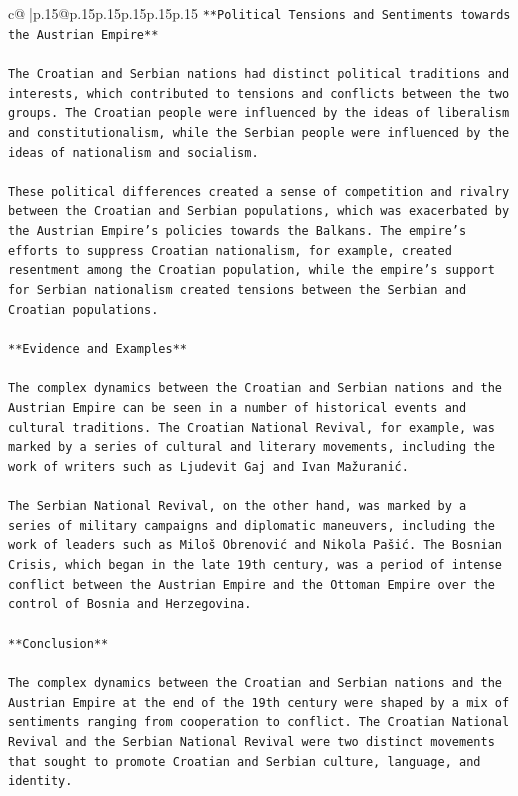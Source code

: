 \documentclass{article}
\begin{document}
{\begin{supertabular}{c@{$\;$}|p{.15\linewidth}@{}p{.15\linewidth}p{.15\linewidth}p{.15\linewidth}p{.15\linewidth}p{.15\linewidth}}
{{{\texttt{**Political Tensions and Sentiments towards the Austrian Empire**} \\
\\ 
\texttt{The Croatian and Serbian nations had distinct political traditions and interests, which contributed to tensions and conflicts between the two groups. The Croatian people were influenced by the ideas of liberalism and constitutionalism, while the Serbian people were influenced by the ideas of nationalism and socialism.} \\
\\ 
\texttt{These political differences created a sense of competition and rivalry between the Croatian and Serbian populations, which was exacerbated by the Austrian Empire's policies towards the Balkans. The empire's efforts to suppress Croatian nationalism, for example, created resentment among the Croatian population, while the empire's support for Serbian nationalism created tensions between the Serbian and Croatian populations.} \\
\\ 
\texttt{**Evidence and Examples**} \\
\\ 
\texttt{The complex dynamics between the Croatian and Serbian nations and the Austrian Empire can be seen in a number of historical events and cultural traditions. The Croatian National Revival, for example, was marked by a series of cultural and literary movements, including the work of writers such as Ljudevit Gaj and Ivan Mažuranić.} \\
\\ 
\texttt{The Serbian National Revival, on the other hand, was marked by a series of military campaigns and diplomatic maneuvers, including the work of leaders such as Miloš Obrenović and Nikola Pašić. The Bosnian Crisis, which began in the late 19th century, was a period of intense conflict between the Austrian Empire and the Ottoman Empire over the control of Bosnia and Herzegovina.} \\
\\ 
\texttt{**Conclusion**} \\
\\ 
\texttt{The complex dynamics between the Croatian and Serbian nations and the Austrian Empire at the end of the 19th century were shaped by a mix of sentiments ranging from cooperation to conflict. The Croatian National Revival and the Serbian National Revival were two distinct movements that sought to promote Croatian and Serbian culture, language, and identity.} \\
}}}
\end{supertabular}}
\end{document}
